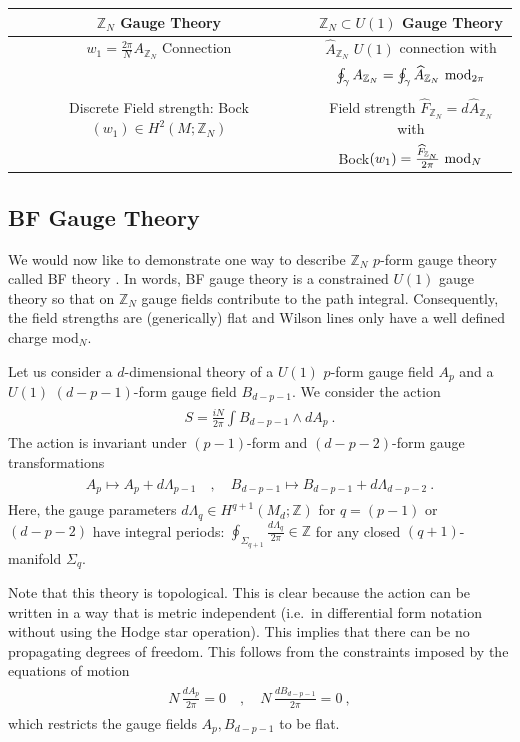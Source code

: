 \documentclass[11pt]{article}
\newcommand{\eq}[1]{\begin{align}\begin{split}#1\end{split}\end{align}}
\newcommand{\twopi}[1]{{\frac{#1}{2\pi}}}
\def\IZ{{\mathbb{Z}}}
\def\IZN{{\mathbb{Z}_N}}
\begin{document}
\begin{center}
\begin{tabular}{|c|c|}
\hline
$\IZ_N$ Gauge Theory & $\IZ_N\subset U(1)$ Gauge Theory\\
\hline 
$w_1=\frac{2\pi}{N} A_{\IZ_N}$ Connection & $\widehat{A}_{\IZ_N}$ $U(1)$ connection with\\
&$\oint_\gamma A_{\IZ_N}=\oint_\gamma\widehat{A}_\IZN~{\rm mod}_{2\pi}$\\
\vspace{-0.3cm}\\
Discrete Field strength: Bock$(w_1)\in H^2(M;\IZ_N)$ & Field strength $\widehat{F}_\IZN=d\widehat{A}_\IZN$ with \\
&Bock$(w_1)=\frac{\widehat{F}_\IZN}{2\pi}~{\rm mod}_N$\\\hline
\end{tabular}
\end{center}


\subsection{BF Gauge Theory}

We would now like to demonstrate one way to describe $\IZ_N$ $p$-form gauge theory called BF theory \cite{Horowitz:1989ng,Maldacena:2001ss,Banks:2010zn}. In words, BF gauge theory is a constrained $U(1)$ gauge theory so that on $\IZ_N$ gauge fields contribute to the path integral. Consequently, the field strengths are (generically) flat and Wilson lines only have a well defined charge mod$_N$. 

Let us consider a $d$-dimensional theory of a $U(1)$ $p$-form gauge field $A_p$ and a  $U(1)$ $(d-p-1)$-form gauge field $B_{d-p-1}$. We consider the action
%
\eq{\label{eq:BF theory}
S=\frac{iN}{2\pi} \int B_{d-p-1} \wedge dA_p~.
}
%
The action is invariant under $(p-1)$-form and $(d-p-2)$-form gauge transformations 
%
\eq{\label{eq:BF theory_action}
A_p\longmapsto A_p+d\Lambda_{p-1}\quad, \quad B_{d-p-1}\longmapsto B_{d-p-1}+d\Lambda_{d-p-2}~. 
}
%
Here, the gauge parameters $d\Lambda_{q}\in H^{q+1}(M_d;\IZ)$ for $q=(p-1)$ or $(d-p-2)$ have integral periods: $\oint_{\Sigma_{q+1}}\frac{d\Lambda_{q}}{2\pi}\in \IZ$ for any closed $(q+1)$-manifold $\Sigma_q$. 

Note that this theory is topological. This is clear because the action can be written in a way that is metric independent (i.e.~in differential form notation without using the Hodge star operation). This implies that there can be no propagating degrees of freedom. This follows from the constraints imposed by the equations of motion 
\eq{
N\,\frac{dA_p}{2\pi}=0\quad, \quad N\,\twopi{dB_{d-p-1}}=0~,
}
which restricts the gauge fields $A_p,B_{d-p-1}$ to be flat. 
\end{document}
